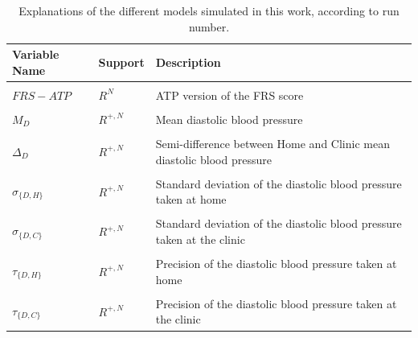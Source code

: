 \documentclass[
]{article}
\begin{document}
\begin{table}[!h]
\centering
\caption{\label{tab:runnumers}Explanations of the different models simulated in this work, according to run number.}
\centering
\begin{tabular}[t]{lll}
\toprule
Variable Name & Support & Description\\
\midrule
\cellcolor{gray!10}{$FRS-1998$} & \cellcolor{gray!10}{$R^N$} & \cellcolor{gray!10}{1998 version of the FRS score}\\
$FRS-ATP$ & $R^N$ & ATP version of the FRS score\\
\cellcolor{gray!10}{$M_S$} & \cellcolor{gray!10}{$R^{+,N}$} & \cellcolor{gray!10}{Mean systolic blood pressure}\\
$M_D$ & $R^{+,N}$ & Mean diastolic blood pressure\\
\cellcolor{gray!10}{$\Delta_S$} & \cellcolor{gray!10}{$R^{+,N}$} & \cellcolor{gray!10}{Semi-difference between Home and Clinic mean systolic blood pressure}\\
$\Delta_D$ & $R^{+,N}$ & Semi-difference between Home and Clinic mean diastolic blood pressure\\
\cellcolor{gray!10}{$\sigma_{\{S,H\}}$} & \cellcolor{gray!10}{$R^{+,N}$} & \cellcolor{gray!10}{Standard deviation of the systolic blood pressure taken at home}\\
$\sigma_{\{D,H\}}$ & $R^{+,N}$ & Standard deviation of the diastolic blood pressure taken at home\\
\cellcolor{gray!10}{$\sigma_{\{S,C\}}$} & \cellcolor{gray!10}{$R^{+,N}$} & \cellcolor{gray!10}{Standard deviation of the systolic blood pressure taken at the clinic}\\
$\sigma_{\{D,C\}}$ & $R^{+,N}$ & Standard deviation of the diastolic blood pressure taken at the clinic\\
\cellcolor{gray!10}{$\tau_{\{S,H\}}$} & \cellcolor{gray!10}{$R^{+,N}$} & \cellcolor{gray!10}{Precision of the systolic blood pressure taken at home}\\
$\tau_{\{D,H\}}$ & $R^{+,N}$ & Precision of the diastolic blood pressure taken at home\\
\cellcolor{gray!10}{$\tau_{\{S,C\}}$} & \cellcolor{gray!10}{$R^{+,N}$} & \cellcolor{gray!10}{Precision of the systolic blood pressure taken at the clinic}\\
$\tau_{\{D,C\}}$ & $R^{+,N}$ & Precision of the diastolic blood pressure taken at the clinic\\
\bottomrule
\end{tabular}
\end{table}
\end{document}
